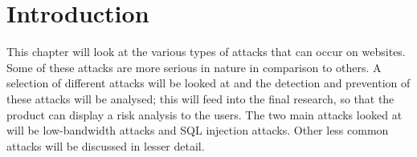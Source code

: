 
\section*{Introduction}
This chapter will look at the various types of attacks that can occur on websites. Some of these attacks are more serious in nature in comparison to others. A selection of different attacks will be looked at and the detection and prevention of these attacks will be analysed; this will feed into the final research, so that the product can display a risk analysis to the users.  The two main attacks looked at will be low-bandwidth attacks and SQL injection attacks. Other less common attacks will be discussed in lesser detail.